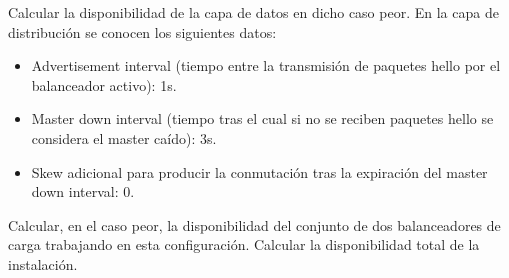 \begin{problem}[11]
Calcular la disponibilidad de la capa de datos en dicho caso peor.
\ppart En la capa de distribución se conocen los siguientes datos:
\begin{itemize}
	\item Advertisement interval (tiempo entre la transmisión de paquetes hello por el balanceador activo): 1s.
	\item Master down interval (tiempo tras el cual si no se reciben paquetes hello se considera el master caído): 3s.
	\item Skew adicional para producir la conmutación tras la expiración del master down interval: 0.
\end{itemize}

Calcular, en el caso peor, la disponibilidad del conjunto de dos balanceadores de carga trabajando en esta configuración.
\ppart Calcular la disponibilidad total de la instalación.

\solution


\end{problem}

